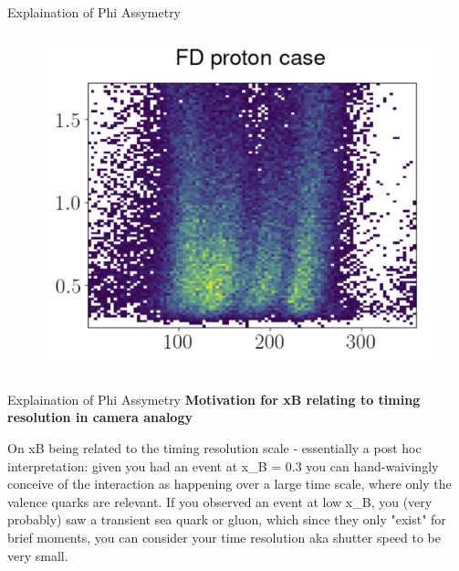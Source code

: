 \documentclass[aspectratio=169]{beamer}
\begin{document}
\begin{frame}{Explaination of Phi Assymetry}
\begin{columns}
   
        
        \begin{figure}
            \centering
            \includegraphics[width=.975\textwidth]{phiassym/fdcase.png}
        \end{figure}
    

\end{columns}

\end{frame}


\begin{frame}{Explaination of Phi Assymetry}
\textbf{Motivation for xB relating to timing resolution in camera analogy}


On xB being related to the timing resolution scale - essentially a post hoc interpretation: given you had an event at x\_B = 0.3 you can hand-waivingly conceive of the interaction as happening over a large time scale, where only the valence quarks are relevant. If you observed an event at low x\_B, you (very probably) saw a transient sea quark or gluon, which since they only "exist" for brief moments, you can consider your time resolution aka shutter speed to be very small.

\end{frame}
\end{document}
